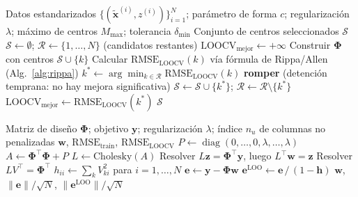 \documentclass[11pt,a4paper]{article}
\newcommand{\Phimat}{\boldsymbol{\Phi}}
\newcommand{\wvec}{\mathbf{w}}
\newcommand{\yvec}{\mathbf{y}}
\begin{document}
\begin{algorithm}[H]
\caption{Selecci\'on greedy de centros guiada por LOOCV}
\label{alg:greedy}
\begin{algorithmic}[1]
\Require Datos estandarizados $\{(\tilde{\mathbf x}^{(i)}, z^{(i)})\}_{i=1}^N$;
par\'ametro de forma $c$; regularizaci\'on $\lambda$; m\'aximo de centros
$M_{\max}$; tolerancia $\delta_{\min}$
\Ensure Conjunto de centros seleccionados $\mathcal{S}$
\State $\mathcal{S} \gets \emptyset$; \quad $\mathcal{R} \gets \{1,\dots,N\}$
\quad (candidatos restantes)
\State $\text{LOOCV}_{\text{mejor}} \gets +\infty$
        \State Construir $\Phimat$ con centros $\mathcal{S}\cup\{k\}$
        \State Calcular $\text{RMSE}_{\text{LOOCV}}(k)$ v\'ia f\'ormula de
        Rippa/Allen (Alg.~\ref{alg:rippa})
    \EndFor
    \State $k^\ast \gets \arg\min_{k\in\mathcal{R}} \text{RMSE}_{\text{LOOCV}}(k)$
        \State \textbf{romper} (detenci\'on temprana: no hay mejora significativa)
    \EndIf
    \State $\mathcal{S} \gets \mathcal{S} \cup \{k^\ast\}$; \quad
    $\mathcal{R} \gets \mathcal{R}\setminus\{k^\ast\}$
    \State $\text{LOOCV}_{\text{mejor}} \gets \text{RMSE}_{\text{LOOCV}}(k^\ast)$
\EndWhile
\State \Return $\mathcal{S}$
\end{algorithmic}
\end{algorithm}

\begin{algorithm}[H]
\caption{C\'alculo de $\text{RMSE}_{\text{LOOCV}}$ (f\'ormula de Rippa/Allen)}
\label{alg:rippa}
\begin{algorithmic}[1]
\Require Matriz de dise\~no $\Phimat$; objetivo $\yvec$; regularizaci\'on
$\lambda$; \'indice $n_{u}$ de columnas no penalizadas
\Ensure $\wvec$, $\text{RMSE}_{\text{train}}$, $\text{RMSE}_{\text{LOOCV}}$
\State $P \gets \operatorname{diag}(0,\dots,0,\lambda,\dots,\lambda)$
\State $A \gets \Phimat^{\!\top}\Phimat + P$
\State $L \gets \text{Cholesky}(A)$ 
\State Resolver $L\mathbf z = \Phimat^{\!\top}\yvec$, luego $L^{\!\top}\wvec =
\mathbf z$ 
\State Resolver $LV^{\!\top} = \Phimat^{\!\top}$ 
\State $h_{ii} \gets \sum_k V_{ki}^2$ para $i=1,\dots,N$
\State $\mathbf{e} \gets \yvec - \Phimat\wvec$
\State $\mathbf{e}^{\text{LOO}} \gets \mathbf{e} \,/\, (1-\mathbf h)$
\State \Return $\wvec$, $\lVert\mathbf e\rVert/\sqrt N$,
$\lVert\mathbf e^{\text{LOO}}\rVert/\sqrt N$
\end{algorithmic}
\end{algorithm}
\end{document}
